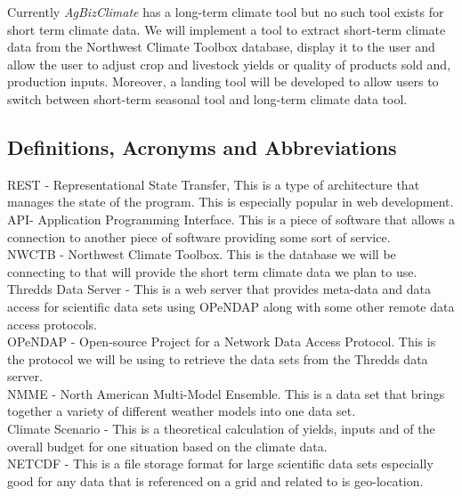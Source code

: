 \documentclass[onecolumn, draftclsnofoot,10pt, compsoc]{article}
\begin{document}
			Currently \textit{AgBizClimate} has a long-term climate tool but no such tool exists for short term climate data. We will implement a tool to extract short-term climate data from the Northwest Climate Toolbox database, display it to the user and allow the user to adjust crop and livestock yields or quality of products sold and, production inputs. Moreover, a landing tool will be developed to allow users to switch between short-term seasonal tool and long-term climate data tool.\\

		\subsection{Definitions, Acronyms and Abbreviations}
			REST - Representational State Transfer, This is a type of architecture that manages the state of the program. This is especially popular in web development.\\
			API- Application Programming Interface. This is a piece of software that allows a connection to another piece of software providing some sort of service.\\
			NWCTB - Northwest Climate Toolbox. This is the database we will be connecting to that will provide the short term climate data we plan to use.\\
			Thredds Data Server - This is a web server that provides meta-data and data access for scientific data sets using OPeNDAP along with some other remote data access protocols.\\
			OPeNDAP - Open-source Project for a Network Data Access Protocol. This is the protocol we will be using to retrieve the data sets from the Thredds data server.\\
			NMME - North American Multi-Model Ensemble. This is a data set that brings together a variety of different weather models into one data set.\\
			Climate Scenario - This is a theoretical calculation of yields, inputs and of the overall budget for one situation based on the climate data.\\
			NETCDF - This is a file storage format for large scientific data sets especially good for any data that is referenced on a grid and related to is geo-location.\\


\end{document}
